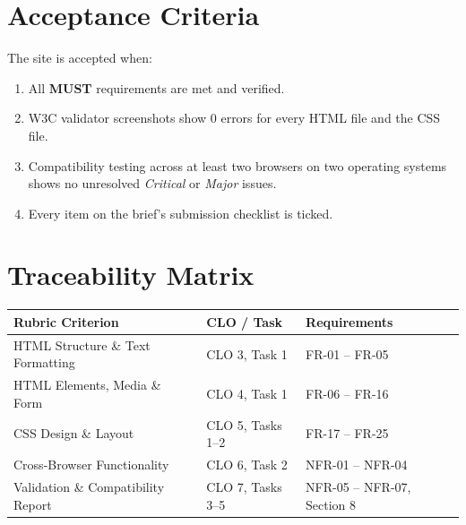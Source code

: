 \documentclass[11pt,a4paper]{article}
\begin{document}
\section{Acceptance Criteria}
The site is accepted when:
\begin{enumerate}
  \item All \textbf{MUST} requirements are met and verified.
  \item W3C validator screenshots show 0 errors for every HTML file and the CSS file.
  \item Compatibility testing across at least two browsers on two operating systems shows
        no unresolved \textit{Critical} or \textit{Major} issues.
  \item Every item on the brief's submission checklist is ticked.
\end{enumerate}

\section{Traceability Matrix}

\begin{center}
\begin{tabularx}{\textwidth}{l l L}
\toprule
\textbf{Rubric Criterion} & \textbf{CLO / Task} & \textbf{Requirements} \\
\midrule
HTML Structure \& Text Formatting & CLO 3, Task 1 & FR-01 -- FR-05 \\
HTML Elements, Media \& Form       & CLO 4, Task 1 & FR-06 -- FR-16 \\
CSS Design \& Layout               & CLO 5, Tasks 1--2 & FR-17 -- FR-25 \\
Cross-Browser Functionality        & CLO 6, Task 2 & NFR-01 -- NFR-04 \\
Validation \& Compatibility Report & CLO 7, Tasks 3--5 & NFR-05 -- NFR-07, Section 8 \\
\bottomrule
\end{tabularx}
\end{center}
\end{document}

